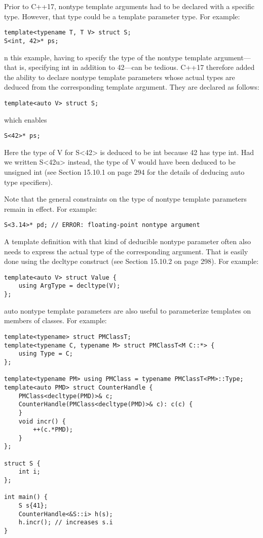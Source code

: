Prior to C++17, nontype template arguments had to be declared with a specific type. However, that type could be a template parameter type. For example:

\begin{lstlisting}[style=styleCXX]
template<typename T, T V> struct S;
S<int, 42>* ps;
\end{lstlisting}

n this example, having to specify the type of the nontype template argument—that is, specifying int in addition to 42—can be tedious. C++17 therefore added the ability to declare nontype template parameters whose actual types are deduced from the corresponding template argument. They are declared as follows:

\begin{lstlisting}[style=styleCXX]
template<auto V> struct S;
\end{lstlisting}

which enables

\begin{lstlisting}[style=styleCXX]
S<42>* ps;
\end{lstlisting}

Here the type of V for S<42> is deduced to be int because 42 has type int. Had we written S<42u> instead, the type of V would have been deduced to be unsigned int (see Section 15.10.1 on page 294 for the details of deducing auto type specifiers).

Note that the general constraints on the type of nontype template parameters remain in effect. For example:

\begin{lstlisting}[style=styleCXX]
S<3.14>* pd; // ERROR: floating-point nontype argument
\end{lstlisting}

A template definition with that kind of deducible nontype parameter often also needs to express the actual type of the corresponding argument. That is easily done using the decltype construct (see Section 15.10.2 on page 298). For example:

\begin{lstlisting}[style=styleCXX]
template<auto V> struct Value {
	using ArgType = decltype(V);
};
\end{lstlisting}

auto nontype template parameters are also useful to parameterize templates on members of classes. For example:

\begin{lstlisting}[style=styleCXX]
template<typename> struct PMClassT;
template<typename C, typename M> struct PMClassT<M C::*> {
	using Type = C;
};

template<typename PM> using PMClass = typename PMClassT<PM>::Type;
template<auto PMD> struct CounterHandle {
	PMClass<decltype(PMD)>& c;
	CounterHandle(PMClass<decltype(PMD)>& c): c(c) {
	}
	void incr() {
		++(c.*PMD);
	}
};

struct S {
	int i;
};

int main() {
	S s{41};
	CounterHandle<&S::i> h(s);
	h.incr(); // increases s.i
}
\end{lstlisting}

